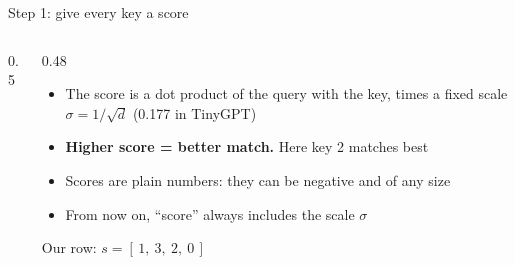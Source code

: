 \documentclass[aspectratio=169,11pt]{beamer}
\newcommand{\vbar}[5]{%
  \fill[#3] (#1,0) rectangle ++(0.7,#2); \draw[black!55] (#1,0) rectangle ++(0.7,#2);
  \node[font=\scriptsize, above] at (#1+0.35,#2) {#4};
  \node[font=\scriptsize, below] at (#1+0.35,0) {#5};}
\newcommand{\baseline}[2]{\draw[black!60] (#1,0) -- (#2,0);}
\begin{document}
\begin{frame}{Step 1: give every key a score}
\begin{columns}[c]
\begin{column}{0.5\textwidth}
\centering
{}
\end{column}
\begin{column}{0.48\textwidth}
\small
\begin{itemize}
\item The score is a dot product of the query with the key, times a fixed scale $\sigma=1/\sqrt d$ (0.177 in TinyGPT)
\item \textbf{Higher score = better match.} Here key 2 matches best
\item Scores are plain numbers: they can be negative and of any size
\item From now on, ``score'' always includes the scale $\sigma$
\end{itemize}
\vspace{2mm}
Our row: $s = [\,1,\ 3,\ 2,\ 0\,]$
\end{column}
\end{columns}
\end{frame}
\end{document}
